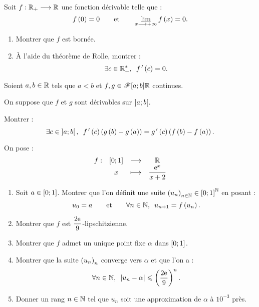 \begin{corr}
\end{corr}

\begin{exo}[Exercice 10]
Soit \(f:\mathbb{R}_+\longrightarrow\mathbb{R}\) une fonction dérivable telle que : \[f\left(0\right)=0\qquad\text{et}\qquad\lim_{x\longrightarrow+\infty}f\left(x\right)=0.\]

\begin{enumerate}
\item Montrer que \(f\) est bornée. \\

\item À l'aide du théorème de Rolle, montrer : \[\quantifs{\exists c\in\Rps}f\prim\paren{c}=0.\]
\end{enumerate}
\end{exo}

\begin{corr}
\end{corr}

\begin{exo}[Exercice 11]
Soient \(a,b\in\mathbb{R}\) tels que \(a<b\) et \(f,g\in\mathscr{F}{\left[a;b\right]}{\mathbb{R}}\) continues.

On suppose que \(f\) et \(g\) sont  dérivables sur \(\left]a;b\right[\).

Montrer : \[\quantifs{\exists c\in\intervee{a}{b}}f\prim\paren{c}\paren{g\paren{b}-g\paren{a}}=g\prim\paren{c}\paren{f\paren{b}-f\paren{a}}.\]
\end{exo}

\begin{corr}
\end{corr}

\begin{exo}[Exercice 12]
On pose : \[\begin{array}[t]{cccc}f : & \left[0;1\right] & \longrightarrow & \mathbb{R} \\ & x & \longmapsto & \dfrac{\mathrm{e}^{x}}{x+2}\end{array}\]

\begin{enumerate}
\item Soit \(a\in\left[0;1\right]\). Montrer que l'on définit une suite \(\left(u_n\right)_{n\in\mathbb{N}}\in\left[0;1\right]^{\mathbb{N}}\) en posant : \[u_0=a\qquad\text{et}\qquad\quantifs{\forall n\in\N}u_{n+1}=f\paren{u_n}.\]

\item Montrer que \(f\) est \(\dfrac{2\mathrm{e}^{}}{9}\)-lipschitzienne. \\

\item Montrer que \(f\) admet un unique point fixe \(\alpha\) dans \(\left[0;1\right]\). \\

\item Montrer que la suite \(\left(u_n\right)_n\) converge vers \(\alpha\) et que l'on a : \[\quantifs{\forall n\in\N}\abs{u_n-\alpha}\leq\paren{\dfrac{2\e{}}{9}}^n.\]

\item Donner un rang \(n\in\mathbb{N}\) tel que \(u_n\) soit une approximation de \(\alpha\) à \(10^{-3}\) près.
\end{enumerate}
\end{exo}

